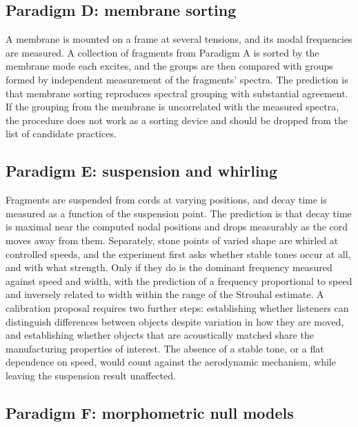 \documentclass[12pt]{article}
\begin{document}
\subsection*{Paradigm D: membrane sorting}

A membrane is mounted on a frame at several tensions, and its modal frequencies are measured. A collection of fragments from Paradigm A is sorted by the membrane mode each excites, and the groups are then compared with groups formed by independent measurement of the fragments' spectra. The prediction is that membrane sorting reproduces spectral grouping with substantial agreement. If the grouping from the membrane is uncorrelated with the measured spectra, the procedure does not work as a sorting device and should be dropped from the list of candidate practices.

\subsection*{Paradigm E: suspension and whirling}

Fragments are suspended from cords at varying positions, and decay time is measured as a function of the suspension point. The prediction is that decay time is maximal near the computed nodal positions and drops measurably as the cord moves away from them. Separately, stone points of varied shape are whirled at controlled speeds, and the experiment first asks whether stable tones occur at all, and with what strength. Only if they do is the dominant frequency measured against speed and width, with the prediction of a frequency proportional to speed and inversely related to width within the range of the Strouhal estimate. A calibration proposal requires two further steps: establishing whether listeners can distinguish differences between objects despite variation in how they are moved, and establishing whether objects that are acoustically matched share the manufacturing properties of interest. The absence of a stable tone, or a flat dependence on speed, would count against the aerodynamic mechanism, while leaving the suspension result unaffected.

\subsection*{Paradigm F: morphometric null models}
\end{document}
